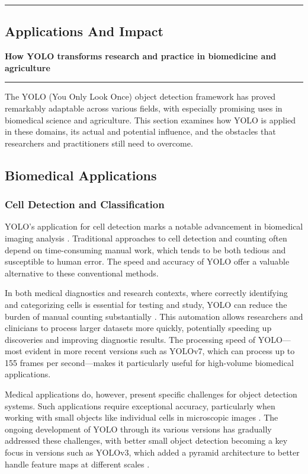 {\color{gray}\hrule}
\begin{center}
	\section{Applications And Impact}
	\textbf{How YOLO transforms research and practice in biomedicine and agriculture}
	\bigskip
\end{center}
{\color{gray}\hrule}
\begin{multicols}{2}
	The YOLO (You Only Look Once) object detection framework has proved remarkably adaptable across various fields, with especially promising uses in biomedical science and agriculture. This section examines how YOLO is applied in these domains, its actual and potential influence, and the obstacles that researchers and practitioners still need to overcome.

	\subsection{Biomedical Applications}
	\subsubsection{Cell Detection and Classification}
	YOLO's application for cell detection marks a notable advancement in biomedical imaging analysis \citep{ChanCell2020}. Traditional approaches to cell detection and counting often depend on time-consuming manual work, which tends to be both tedious and susceptible to human error. The speed and accuracy of YOLO offer a valuable alternative to these conventional methods.

	In both medical diagnostics and research contexts, where correctly identifying and categorizing cells is essential for testing and study, YOLO can reduce the burden of manual counting substantially \citep{electronics8030292}. This automation allows researchers and clinicians to process larger datasets more quickly, potentially speeding up discoveries and improving diagnostic results. The processing speed of YOLO—most evident in more recent versions such as YOLOv7, which can process up to 155 frames per second—makes it particularly useful for high-volume biomedical applications.

	Medical applications do, however, present specific challenges for object detection systems. Such applications require exceptional accuracy, particularly when working with small objects like individual cells in microscopic images \citep{ChanCell2020}. The ongoing development of YOLO through its various versions has gradually addressed these challenges, with better small object detection becoming a key focus in versions such as YOLOv3, which added a pyramid architecture to better handle feature maps at different scales \citep{redmon2018yolov3}.


\end{multicols}
